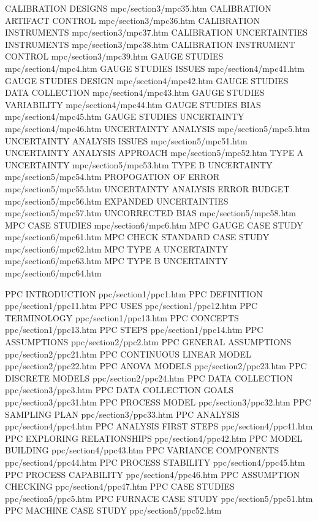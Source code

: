 CALIBRATION DESIGNS                     mpc/section3/mpc35.htm
CALIBRATION ARTIFACT CONTROL            mpc/section3/mpc36.htm
CALIBRATION INSTRUMENTS                 mpc/section3/mpc37.htm
CALIBRATION UNCERTAINTIES INSTRUMENTS   mpc/section3/mpc38.htm
CALIBRATION INSTRUMENT CONTROL          mpc/section3/mpc39.htm
GAUGE STUDIES                           mpc/section4/mpc4.htm
GAUGE STUDIES ISSUES                    mpc/section4/mpc41.htm
GAUGE STUDIES DESIGN                    mpc/section4/mpc42.htm
GAUGE STUDIES DATA COLLECTION           mpc/section4/mpc43.htm
GAUGE STUDIES VARIABILITY               mpc/section4/mpc44.htm
GAUGE STUDIES BIAS                      mpc/section4/mpc45.htm
GAUGE STUDIES UNCERTAINTY               mpc/section4/mpc46.htm
UNCERTAINTY ANALYSIS                    mpc/section5/mpc5.htm
UNCERTAINTY ANALYSIS ISSUES             mpc/section5/mpc51.htm
UNCERTAINTY ANALYSIS APPROACH           mpc/section5/mpc52.htm
TYPE A UNCERTAINTY                      mpc/section5/mpc53.htm
TYPE B UNCERTAINTY                      mpc/section5/mpc54.htm
PROPOGATION OF ERROR                    mpc/section5/mpc55.htm
UNCERTAINTY ANALYSIS ERROR BUDGET       mpc/section5/mpc56.htm
EXPANDED UNCERTAINTIES                  mpc/section5/mpc57.htm
UNCORRECTED BIAS                        mpc/section5/mpc58.htm
MPC CASE STUDIES                        mpc/section6/mpc6.htm
MPC GAUGE CASE STUDY                    mpc/section6/mpc61.htm
MPC CHECK STANDARD CASE STUDY           mpc/section6/mpc62.htm
MPC TYPE A UNCERTAINTY                  mpc/section6/mpc63.htm
MPC TYPE B UNCERTAINTY                  mpc/section6/mpc64.htm

PPC INTRODUCTION                        ppc/section1/ppc1.htm
PPC DEFINITION                          ppc/section1/ppc11.htm
PPC USES                                ppc/section1/ppc12.htm
PPC TERMINOLOGY                         ppc/section1/ppc13.htm
PPC CONCEPTS                            ppc/section1/ppc13.htm
PPC STEPS                               ppc/section1/ppc14.htm
PPC ASSUMPTIONS                         ppc/section2/ppc2.htm
PPC GENERAL ASSUMPTIONS                 ppc/section2/ppc21.htm
PPC CONTINUOUS LINEAR MODEL             ppc/section2/ppc22.htm
PPC ANOVA MODELS                        ppc/section2/ppc23.htm
PPC DISCRETE MODELS                     ppc/section2/ppc24.htm
PPC DATA COLLECTION                     ppc/section3/ppc3.htm
PPC DATA COLLECTION GOALS               ppc/section3/ppc31.htm
PPC PROCESS MODEL                       ppc/section3/ppc32.htm
PPC SAMPLING PLAN                       ppc/section3/ppc33.htm
PPC ANALYSIS                            ppc/section4/ppc4.htm
PPC ANALYSIS FIRST STEPS                ppc/section4/ppc41.htm
PPC EXPLORING RELATIONSHIPS             ppc/section4/ppc42.htm
PPC MODEL BUILDING                      ppc/section4/ppc43.htm
PPC VARIANCE COMPONENTS                 ppc/section4/ppc44.htm
PPC PROCESS STABILITY                   ppc/section4/ppc45.htm
PPC PROCESS CAPABILITY                  ppc/section4/ppc46.htm
PPC ASSUMPTION CHECKING                 ppc/section4/ppc47.htm
PPC CASE STUDIES                        ppc/section5/ppc5.htm
PPC FURNACE CASE STUDY                  ppc/section5/ppc51.htm
PPC MACHINE CASE STUDY                  ppc/section5/ppc52.htm

